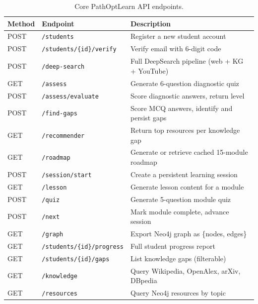 \documentclass[12pt,a4paper]{article}
\begin{document}
\begin{table}[H]
  \centering
  \caption{Core PathOptLearn API endpoints.}
  \label{tab:api}
  \begin{tabular}{@{}llp{7cm}@{}}
    \toprule
    \textbf{Method} & \textbf{Endpoint} & \textbf{Description} \\
    \midrule
    POST & \texttt{/students}               & Register a new student account \\
    POST & \texttt{/students/\{id\}/verify} & Verify email with 6-digit code \\
    POST & \texttt{/deep-search}            & Full DeepSearch pipeline (web + KG + YouTube) \\
    GET  & \texttt{/assess}                 & Generate 6-question diagnostic quiz \\
    POST & \texttt{/assess/evaluate}        & Score diagnostic answers, return level \\
    POST & \texttt{/find-gaps}              & Score MCQ answers, identify and persist gaps \\
    GET  & \texttt{/recommender}            & Return top resources per knowledge gap \\
    GET  & \texttt{/roadmap}                & Generate or retrieve cached 15-module roadmap \\
    POST & \texttt{/session/start}          & Create a persistent learning session \\
    GET  & \texttt{/lesson}                 & Generate lesson content for a module \\
    POST & \texttt{/quiz}                   & Generate 5-question module quiz \\
    POST & \texttt{/next}                   & Mark module complete, advance session \\
    GET  & \texttt{/graph}                  & Export Neo4j graph as \{nodes, edges\} \\
    GET  & \texttt{/students/\{id\}/progress} & Full student progress report \\
    GET  & \texttt{/students/\{id\}/gaps}   & List knowledge gaps (filterable) \\
    GET  & \texttt{/knowledge}              & Query Wikipedia, OpenAlex, arXiv, DBpedia \\
    GET  & \texttt{/resources}              & Query Neo4j resources by topic \\
    \bottomrule
  \end{tabular}
\end{table}
\end{document}
